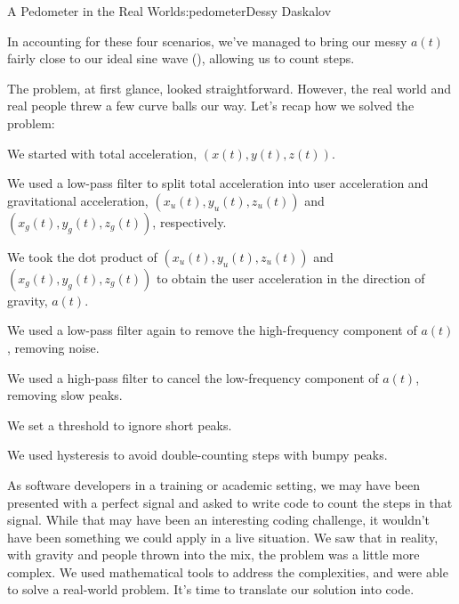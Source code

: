 \begin{aosachapter}{A Pedometer in the Real World}{s:pedometer}{Dessy Daskalov}
\label{peaks-that-are-juuuust-right}


In accounting for these four scenarios, we've managed to bring our messy
$a(t)$ fairly close to our ideal sine wave
(), allowing us to count
steps.

\label{recap}

The problem, at first glance, looked straightforward. However, the real
world and real people threw a few curve balls our way. Let's recap how
we solved the problem:

\begin{aosaenumerate}
\def\labelenumi{\arabic{enumi}.}

\item
  We started with total acceleration, $(x(t), y(t), z(t))$.
\item
  We used a low-pass filter to split total acceleration into user
  acceleration and gravitational acceleration,
  $(x_{u}(t), y_{u}(t), z_{u}(t))$ and $(x_{g}(t), y_{g}(t), z_{g}(t))$,
  respectively.
\item
  We took the dot product of $(x_{u}(t), y_{u}(t), z_{u}(t))$ and
  $(x_{g}(t), y_{g}(t), z_{g}(t))$ to obtain the user acceleration in
  the direction of gravity, $a(t)$.
\item
  We used a low-pass filter again to remove the high-frequency component
  of $a(t)$, removing noise.
\item
  We used a high-pass filter to cancel the low-frequency component of
  $a(t)$, removing slow peaks.
\item
  We set a threshold to ignore short peaks.
\item
  We used hysteresis to avoid double-counting steps with bumpy peaks.
\end{aosaenumerate}

As software developers in a training or academic setting, we may have
been presented with a perfect signal and asked to write code to count
the steps in that signal. While that may have been an interesting coding
challenge, it wouldn't have been something we could apply in a live
situation. We saw that in reality, with gravity and people thrown into
the mix, the problem was a little more complex. We used mathematical
tools to address the complexities, and were able to solve a real-world
problem. It's time to translate our solution into code.


\end{aosachapter}
